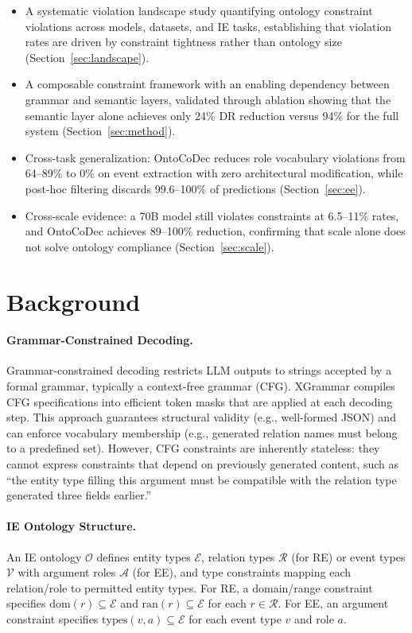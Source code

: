 \documentclass[11pt,a4paper]{article}
\newcommand{\ours}{OntoCoDec}
\begin{document}
\begin{itemize}[nosep,leftmargin=*]
\item A systematic violation landscape study quantifying ontology constraint violations across models, datasets, and IE tasks, establishing that violation rates are driven by constraint tightness rather than ontology size (Section~\ref{sec:landscape}).
\item A composable constraint framework with an enabling dependency between grammar and semantic layers, validated through ablation showing that the semantic layer alone achieves only 24\% DR reduction versus 94\% for the full system (Section~\ref{sec:method}).
\item Cross-task generalization: \ours{} reduces role vocabulary violations from 64--89\% to 0\% on event extraction with zero architectural modification, while post-hoc filtering discards 99.6--100\% of predictions (Section~\ref{sec:ee}).
\item Cross-scale evidence: a 70B model still violates constraints at 6.5--11\% rates, and \ours{} achieves 89--100\% reduction, confirming that scale alone does not solve ontology compliance (Section~\ref{sec:scale}).
\end{itemize}

\section{Background}

\paragraph{Grammar-Constrained Decoding.}
Grammar-constrained decoding restricts LLM outputs to strings accepted by a formal grammar, typically a context-free grammar (CFG). XGrammar compiles CFG specifications into efficient token masks that are applied at each decoding step. This approach guarantees structural validity (e.g., well-formed JSON) and can enforce vocabulary membership (e.g., generated relation names must belong to a predefined set). However, CFG constraints are inherently stateless: they cannot express constraints that depend on previously generated content, such as ``the entity type filling this argument must be compatible with the relation type generated three fields earlier.''

\paragraph{IE Ontology Structure.}
An IE ontology $\mathcal{O}$ defines entity types $\mathcal{E}$, relation types $\mathcal{R}$ (for RE) or event types $\mathcal{V}$ with argument roles $\mathcal{A}$ (for EE), and type constraints mapping each relation/role to permitted entity types. For RE, a domain/range constraint specifies $\text{dom}(r) \subseteq \mathcal{E}$ and $\text{ran}(r) \subseteq \mathcal{E}$ for each $r \in \mathcal{R}$. For EE, an argument constraint specifies $\text{types}(v, a) \subseteq \mathcal{E}$ for each event type $v$ and role $a$.
\end{document}
